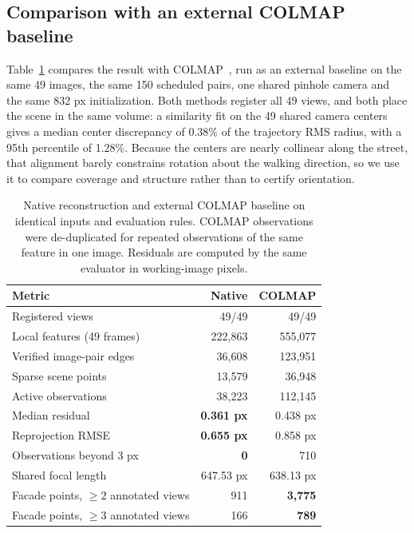 \documentclass[11pt,a4paper]{article}
\begin{document}
\subsection{Comparison with an external COLMAP baseline}
\label{sec:discussion-colmap}

Table~\ref{tab:colmap} compares the result with COLMAP~\cite{schonberger2016sfm}, run as an external baseline on the same 49 images, the same 150 scheduled pairs, one shared pinhole camera and the same 832 px \mbox{initialization}. Both methods register all 49 views, and both place the scene in the same volume: a similarity fit on the 49 shared camera centers gives a median center discrepancy of 0.38\% of the trajectory RMS radius, with a 95th percentile of 1.28\%. Because the centers are nearly collinear along the street, that alignment barely constrains rotation about the walking direction, so we use it to compare coverage and structure rather than to certify orientation.

\begin{table}[htbp]
  \centering
  \small
  \begin{tabular}{@{}lrr@{}}
    \toprule
    Metric & Native & COLMAP \\
    \midrule
    Registered views & 49/49 & 49/49 \\
    Local features (49 frames) & 222{,}863 & 555{,}077 \\
    Verified image-pair edges & 36{,}608 & 123{,}951 \\
    Sparse scene points & 13{,}579 & 36{,}948 \\
    Active observations & 38{,}223 & 112{,}145 \\
    Median residual & \textbf{0.361 px} & 0.438 px \\
    Reprojection RMSE & \textbf{0.655 px} & 0.858 px \\
    Observations beyond 3 px & \textbf{0} & 710 \\
    Shared focal length & 647.53 px & 638.13 px \\
    Facade points, \(\geq 2\) annotated views & 911 & \textbf{3{,}775} \\
    Facade points, \(\geq 3\) annotated views & 166 & \textbf{789} \\
    \bottomrule
  \end{tabular}
  \caption{Native reconstruction and external COLMAP baseline on identical inputs and evaluation rules. COLMAP observations were de-duplicated for repeated observations of the same feature in one image. Residuals are computed by the same evaluator in working-image pixels.}
  \label{tab:colmap}
\end{table}
\end{document}

